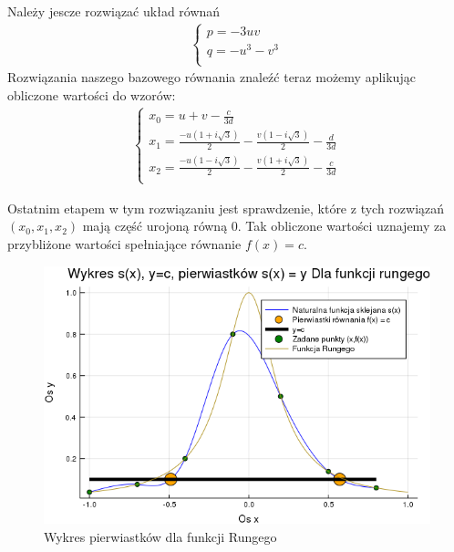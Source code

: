\documentclass[paper=a4, fontsize=11pt]{scrartcl} %
\numberwithin{equation}{section} %
\numberwithin{figure}{section} %
\numberwithin{table}{section} %
\begin{document}
Należy jescze rozwiązać układ równań
\begin{align}
\begin{cases}
p = -3uv \\
q = -u^3 - v^3 \\
\end{cases}
\end{align}
Rozwiązania naszego bazowego równania znaleźć teraz możemy aplikując obliczone wartości do wzorów: \medbreak
\begin{align}
\begin{cases}
x_{0} = u + v -\frac{c}{3d} \\
x_{1} = \frac{-u(1+i\sqrt{3})}{2} - \frac{v(1 -i\sqrt{3})}{2} - \frac{d}{3d} \\
x_{2} = \frac{-u(1-i\sqrt{3})}{2} - \frac{v(1 + i\sqrt{3})}{2} - \frac{c}{3d} \\
\end{cases}
\end{align}

Ostatnim etapem w tym rozwiązaniu jest sprawdzenie, które z tych rozwiązań $(x_{0}, x_{1}, x_{2})$ mają część urojoną równą $0$.
Tak obliczone wartości uznajemy za przybliżone wartości spełniające równanie $f(x) = c$.
\begin{figure}[h!]
 \includegraphics[width=0.95\linewidth]{funkcjarungego.png}
  \caption{Wykres pierwiastków dla funkcji Rungego}
  \label{runge}
\end{figure}
\FloatBarrier
\end{document}
